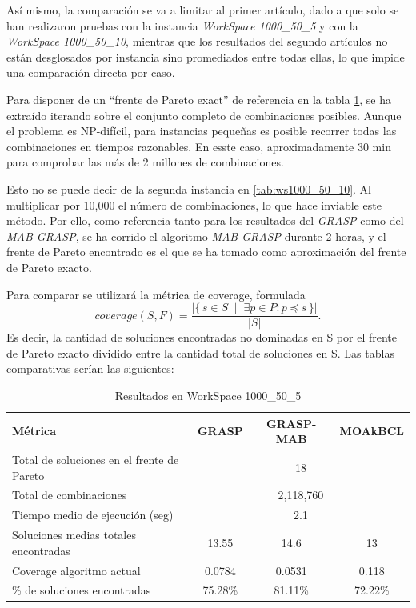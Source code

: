 \documentclass[12pt,a4paper]{book}
\begin{document}
Así mismo, la comparación se va a limitar al primer artículo, dado a que solo se han realizaron pruebas con la instancia \textit{WorkSpace 1000\_50\_5} y con la \textit{WorkSpace 1000\_50\_10}, mientras que los resultados del segundo artículos no están desglosados 
por instancia sino promediados entre todas ellas, lo que impide una comparación directa por caso.

Para disponer de un ``frente de Pareto exact'' de referencia en la tabla \ref{tab:ws1000_50_5}, se ha extraído iterando sobre el conjunto completo de combinaciones posibles.
Aunque el problema es NP-difícil, para instancias pequeñas es posible recorrer todas las combinaciones en tiempos razonables. En esste caso, aproximadamente 30 min para comprobar las más de 2 millones de combinaciones. 

Esto no se puede decir de la segunda instancia en \ref{tab:ws1000_50_10}. Al multiplicar por 10,000 el número de combinaciones, lo que hace inviable este método. Por ello, como referencia tanto para los resultados del \textit{GRASP} como del \textit{MAB-GRASP},
se ha corrido el algoritmo \textit{MAB-GRASP} durante 2 horas, y el frente de Pareto encontrado es el que se ha tomado como aproximación del frente de Pareto exacto.

Para comparar se utilizará la métrica de coverage, formulada
$$coverage(S,F) = \frac{\left| \{\, s \in S \;\mid\; \exists p \in P : p \preceq s \,\} \right|}{|S|}.$$
Es decir, la cantidad de soluciones encontradas no dominadas en S por el frente de Pareto exacto dividido entre la cantidad total de soluciones en S.
Las tablas comparativas serían las siguientes:

\begin{table}[H]
\centering
\caption{Resultados en WorkSpace 1000\_50\_5}
\label{tab:ws1000_50_5}
\begin{tabular}{|l|c|c|c|}
\hline
\textbf{Métrica} & \textbf{GRASP} & \textbf{GRASP-MAB} & \textbf{MOAkBCL} \\ \hline
Total de soluciones en el frente de Pareto 
    & \multicolumn{3}{c|}{18} \\ \hline
Total de combinaciones 
    & \multicolumn{3}{c|}{2,118,760} \\ \hline
Tiempo medio de ejecución (seg) 
    & \multicolumn{3}{c|}{2.1} \\ \hline
Soluciones medias totales encontradas & 13.55 & 14.6 & 13 \\ \hline
Coverage algoritmo actual & 0.0784 & 0.0531 & 0.118 \\ \hline
\% de soluciones encontradas & 75.28\% & 81.11\% & 72.22\% \\ \hline
\end{tabular}
\end{table}
\end{document}

